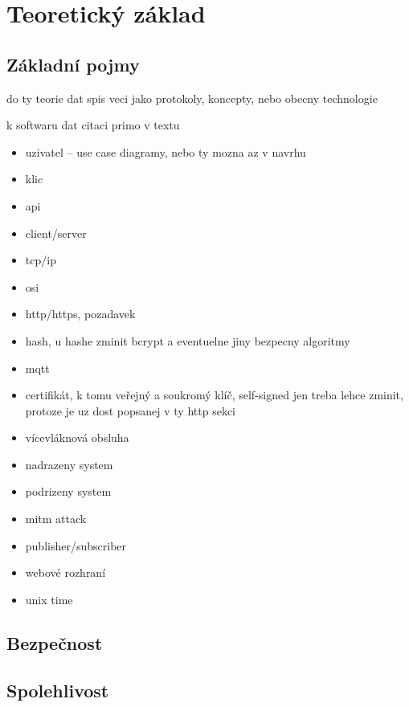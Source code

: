 \chapter{Teoretický základ}
\label{sec:te}

\section{Základní pojmy}

do ty teorie dat spis veci jako protokoly, koncepty, nebo obecny technologie

k softwaru dat citaci primo v textu

\begin{itemize}
    \item uzivatel -- use case diagramy, nebo ty mozna az v navrhu
    \item klic
    \item api
    \item client/server
    \item tcp/ip
    \item osi
    \item http/https, pozadavek
    \item hash, u hashe zminit bcrypt a eventuelne jiny bezpecny algoritmy
    \item mqtt
    \item certifikát, k tomu veřejný a soukromý klíč, self-signed jen treba lehce zminit, protoze je uz dost popsanej v ty http sekci
    \item vícevláknová obsluha
    \item nadrazeny system
    \item podrizeny system
    \item mitm attack
    \item publisher/subscriber
    \item webové rozhraní
    \item unix time
\end{itemize}

\section{Bezpečnost}

\section{Spolehlivost}